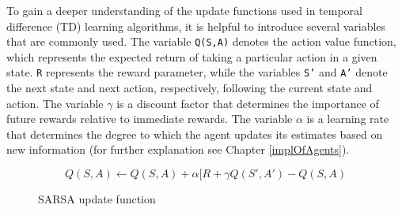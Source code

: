 To gain a deeper understanding of the update functions used in temporal difference (TD) learning algorithms, it is helpful to introduce several variables that are commonly used. The variable \texttt{Q(S,A)} denotes the action value function, which represents the expected return of taking a particular action in a given state. \texttt{R} represents the reward parameter, while the variables \texttt{S'} and \texttt{A'} denote the next state and next action, respectively, following the current state and action. The variable $\gamma$ is a discount factor that determines the importance of future rewards relative to immediate rewards. The variable $\alpha$ is a learning rate that determines the degree to which the agent updates its estimates based on new information (for further explanation see Chapter \ref{implOfAgents}).

\begin{figure}[h]
    \centering
   $$Q(S,A) \leftarrow Q(S,A) + \alpha [R + \gamma Q(S',A') - Q(S,A)$$
    \caption{SARSA update function}
    \label{algo:S}
\end{figure}

